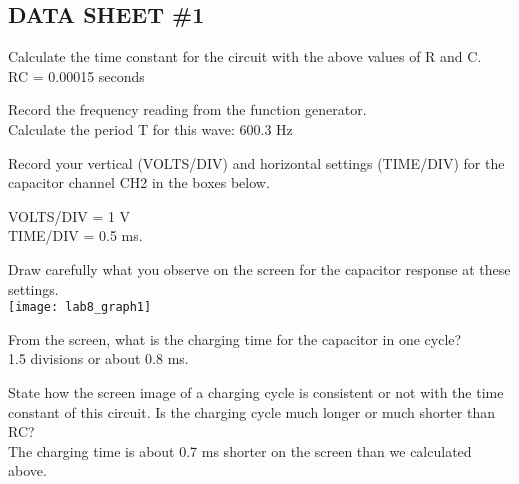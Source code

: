 \subsection{DATA SHEET \#1} 

	\item Calculate the time constant for the circuit with the above values of R and C.\\
		
		RC = 0.00015 seconds
	\item Record the frequency reading from the function generator.\\
	
		Calculate the period T for this wave: 600.3 Hz \\
		
	\item Record your vertical (VOLTS/DIV) and horizontal settings (TIME/DIV) for the capacitor channel CH2 in the boxes below.
	
		VOLTS/DIV = 1 V\\
		
		TIME/DIV = 0.5 ms.
	\begin{samepage}
	\item Draw carefully what you observe on the screen for the capacitor response at these settings.\\
	
		\texttt{[image: lab8\_graph1]}
	\end{samepage}
	\item From the screen, what is the charging time for the capacitor in one cycle?\\
	
		1.5 divisions or about 0.8 ms.\\
	
	\item State how the screen image of a charging cycle is consistent or not with the time constant of this circuit.  Is the charging cycle much longer or much shorter than RC?\\
	
		The charging time is about 0.7 ms shorter on the screen than we calculated above.
	
		